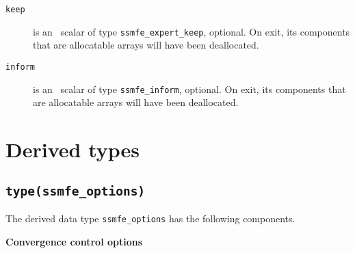 \begin{description}
%
\item[\texttt{keep}] is an \intentinout\ scalar of type 
{\tt ssmfe\_expert\_keep}, optional. 
On exit, its components that are allocatable arrays will have been deallocated. 
%
\item[\texttt{inform}] is an \intentinout\ scalar of type {\tt ssmfe\_inform}, 
optional.
On exit, its components that are allocatable arrays will have been deallocated. 
%
\end{description}

\section{Derived types}

\subsection{\texttt{type(ssmfe\_options)}}
\label{ssmfe_expert:type:options}

The derived data type
{\tt ssmfe\_options}
has the following components.

\bigskip
\noindent
{\bf Convergence control options}

